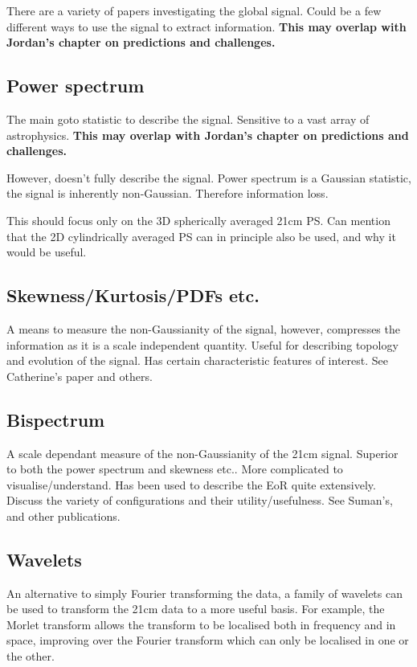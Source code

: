 There are a variety of papers investigating the global signal. Could be a few different ways to use the signal to extract information. \textbf{This may overlap with Jordan's chapter on predictions and challenges.}

\subsection{Power spectrum}

The main goto statistic to describe the signal. Sensitive to a vast array of astrophysics. \textbf{This may overlap with Jordan's chapter on predictions and challenges.}

However, doesn't fully describe the signal. Power spectrum is a Gaussian statistic, the signal is inherently non-Gaussian. Therefore information loss.

This should focus only on the 3D spherically averaged 21cm PS. Can mention that the 2D cylindrically averaged PS can in principle also be used, and why it would be useful.

\subsection{Skewness/Kurtosis/PDFs etc.}

A means to measure the non-Gaussianity of the signal, however, compresses the information as it is a scale independent quantity. Useful for describing topology and evolution of the signal. Has certain characteristic features of interest. See Catherine's paper and others.

\subsection{Bispectrum}

A scale dependant measure of the non-Gaussianity of the 21cm signal. Superior to both the power spectrum and skewness etc.. More complicated to visualise/understand. Has been used to describe the EoR quite extensively. Discuss the variety of configurations and their utility/usefulness. See Suman's, and other publications.

\subsection{Wavelets}

An alternative to simply Fourier transforming the data, a family of wavelets can be used to transform the 21cm data to a more useful basis. For example, the Morlet transform allows the transform to be localised both in frequency and in space, improving over the Fourier transform which can only be localised in one or the other. 


